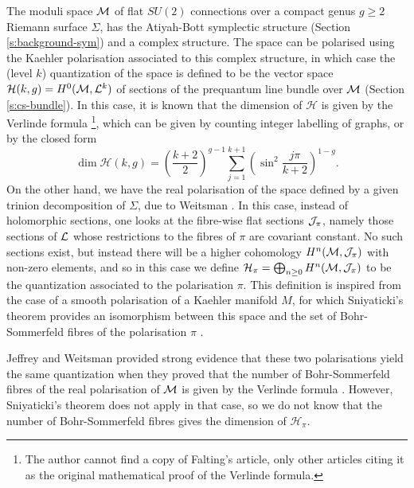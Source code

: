 
The moduli space $\mathcal{M}$ of flat $SU(2)$ connections over a compact genus $g\geq 2$ Riemann surface $\Sigma$, has the Atiyah-Bott symplectic structure (Section \ref{s:background-sym}) and a complex structure. The space can be polarised using the Kaehler polarisation associated to this complex structure, in which case the (level $k$) quantization of the space is defined to be the vector space $\mathcal{H}(k,g)=H^0(\mathcal{M},\mathcal{L}^k)$ of sections of the prequantum line bundle over $\mathcal{M}$ (Section \ref{s:cs-bundle}). In this case, it is known that the dimension of $\mathcal{H}$ is given by the Verlinde formula \cite{verlinde_fusion_1988}\cite{schottenloher_mathematical_2008}\cite{faltings_proof_1994}\footnote{The author cannot find a copy of Falting's article, only other articles citing it as the original mathematical proof of the Verlinde formula.}, which can be given by counting integer labelling of graphs, or by the closed form 
\begin{equation}
	\dim \mathcal{H}(k,g) = \left(
	\frac{k+2}{2}
	\right)^{g-1}\sum_{j=1}^{k+1}\left(
	\sin^2\frac{j\pi}{k+2}
	\right)^{1-g}.
\end{equation}
On the other hand, we have the real polarisation of the space defined by a given trinion decomposition of $\Sigma$, due to Weitsman \cite{weitsman_real_1992}. In this case, instead of holomorphic sections, one looks at the fibre-wise flat sections $\mathcal{J}_{\pi}$, namely those sections of $\mathcal{L}$ whose restrictions to the fibres of $\pi$ are covariant constant. No such sections exist, but instead there will be a higher cohomology $H^n(\mathcal{M},\mathcal{J}_\pi)$ with non-zero elements, and so in this case we define $\mathcal{H}_\pi = \bigoplus_{n\geq 0} H^n(\mathcal{M}, \mathcal{J}_{\pi})$ to be the quantization associated to the polarisation $\pi$. This definition is inspired from the case of a smooth polarisation of a Kaehler manifold $M$, for which Sniyaticki's theorem provides an isomorphism between this space and the set of Bohr-Sommerfeld fibres of the polarisation $\pi$ \cite{sniatycki_cohomology_1977}.

Jeffrey and Weitsman provided strong evidence that these two polarisations yield the same quantization when they proved that the number of Bohr-Sommerfeld fibres of the real polarisation of $\mathcal{M}$ is given by the Verlinde formula \cite{jeffrey_bohr-sommerfeld_1992}. However, Sniyaticki's theorem does not apply in that case, so we do not know that the number of Bohr-Sommerfeld fibres gives the dimension of $\mathcal{H}_\pi$.

